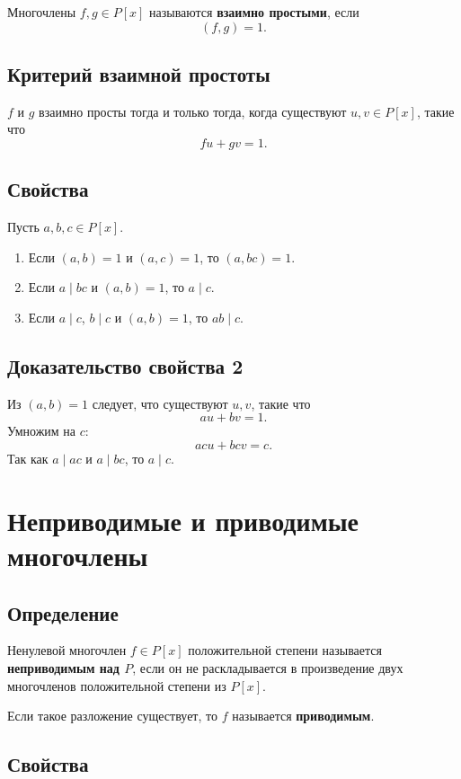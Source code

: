\documentclass[12pt,a4paper]{article}
\begin{document}
Многочлены $f,g\in P[x]$ называются \textbf{взаимно простыми}, если
\[
    (f,g)=1.
\]

\subsection*{Критерий взаимной простоты}

$f$ и $g$ взаимно просты тогда и только тогда, когда существуют $u,v\in P[x]$, такие что
\[
    fu+gv=1.
\]

\subsection*{Свойства}

Пусть $a,b,c\in P[x]$.

\begin{enumerate}
    \item Если $(a,b)=1$ и $(a,c)=1$, то $(a,bc)=1$.
    \item Если $a\mid bc$ и $(a,b)=1$, то $a\mid c$.
    \item Если $a\mid c$, $b\mid c$ и $(a,b)=1$, то $ab\mid c$.
\end{enumerate}

\subsection*{Доказательство свойства 2}

Из $(a,b)=1$ следует, что существуют $u,v$, такие что
\[
    au+bv=1.
\]
Умножим на $c$:
\[
    acu+bcv=c.
\]
Так как $a\mid ac$ и $a\mid bc$, то $a\mid c$.

\section{Неприводимые и приводимые многочлены}

\subsection*{Определение}

Ненулевой многочлен $f\in P[x]$ положительной степени называется \textbf{неприводимым над $P$}, если он не раскладывается в произведение двух многочленов положительной степени из $P[x]$.

Если такое разложение существует, то $f$ называется \textbf{приводимым}.

\subsection*{Свойства}
\end{document}
